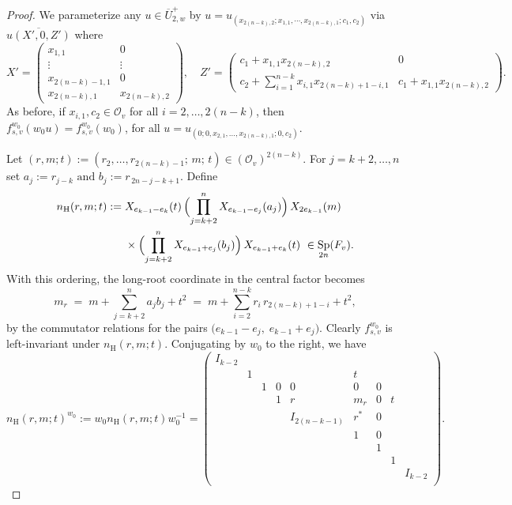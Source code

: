 \documentclass[11pt,notitlepage]{amsart}
\theoremstyle{definition}
\theoremstyle{remark}
\newcommand{\calO}{\mathcal{O}}
\newcommand{\nHeis}{n_{\mathrm{H}}}
\DeclareMathOperator{\Sp}{Sp}
\begin{document}
\begin{proof}
We parameterize any $u\in \overline{U}^{+}_{2,w}$ by
$u=u_{(x_{2(n-k),2};x_{1,1},\cdots,x_{2(n-k),1};c_1,c_2)}$ via $\overline{u(X',0,Z')}$ where
\[
X'=\begin{pmatrix}
    x_{1,1}&0\\
    \vdots&\vdots\\
    x_{2(n-k)-1,1}&0\\
    x_{2(n-k),1}&x_{2(n-k),2}
  \end{pmatrix},\quad
Z'=\begin{pmatrix}
    c_1+x_{1,1}x_{2(n-k),2}&0\\
    c_2 + \displaystyle\sum_{i=1}^{n-k}x_{i,1} x_{2(n-k)+1-i,1}&c_1+x_{1,1}x_{2(n-k),2}
  \end{pmatrix}.
\]
As before, if $x_{i,1},c_2\in \calO_v$ for all $i=2,\dots,2(n-k)$, then $f_{s,v}^{w_0}(w_0u)=f_{s,v}^{w_0}(w_0)$, for all $u=u_{(0;0,x_{2,1},\dots,x_{2(n-k),1};0,c_2)}$.


Let $(r,m;t):=(r_2,\dots,r_{2(n-k)-1};\,m;\,t)\in (\calO_v)^{2(n-k)}$.
For $j=k+2,\dots,n$ set
$a_j:=r_{j-k}\text{ and } b_j:=r_{\,2n-j-k+1}$.
Define
\begin{equation}\label{def:nHeis-root}
\begin{aligned}
\nHeis(r,m;t)
:=\;&
X_{e_{k-1}-e_k}(t)\,
\Bigl(\prod_{j=k+2}^{n} X_{e_{k-1}-e_j}(a_j)\Bigr)\,
X_{2e_{k-1}}(m)\\
&\times
\Bigl(\prod_{j=k+2}^{n} X_{e_{k-1}+e_j}(b_j)\Bigr)\,
X_{e_{k-1}+e_k}(t)
\ \in \Sp_{2n}(F_v).
\end{aligned}
\end{equation}
With this ordering, the long-root coordinate in the central factor becomes
\[
m_r \;=\; m+\sum_{j=k+2}^{n} a_j b_j +t^2
\;=\; m+\sum_{i=2}^{n-k} r_i\,r_{2(n-k)+1-i}+t^2,
\]
by the commutator relations for the pairs
$\bigl(e_{k-1}-e_j,\;e_{k-1}+e_j\bigr)$.
Clearly $f^{w_0}_{s,v}$ is left-invariant under $\nHeis(r,m;t)$.
Conjugating by $w_0$ to the right, we have
\begin{equation}
  \nHeis(r,m;t)^{w_0} := w_0\nHeis(r,m;t)w_0^{-1} = \begin{pmatrix}
    I_{k-2}&&&&&&&&\\
    &1&&&&t&&&\\
    &&1&0&0&0&0&&\\
    &&&1&r&m_r&0&t&\\
    &&&&I_{2(n-k-1)}&r^\ast&0&&\\
    &&&&&1&0&&\\
    &&&&&&1&&\\
    &&&&&&&1&\\
    &&&&&&&&I_{k-2}\\
  \end{pmatrix}.
\end{equation}


\end{proof}
\end{document}
